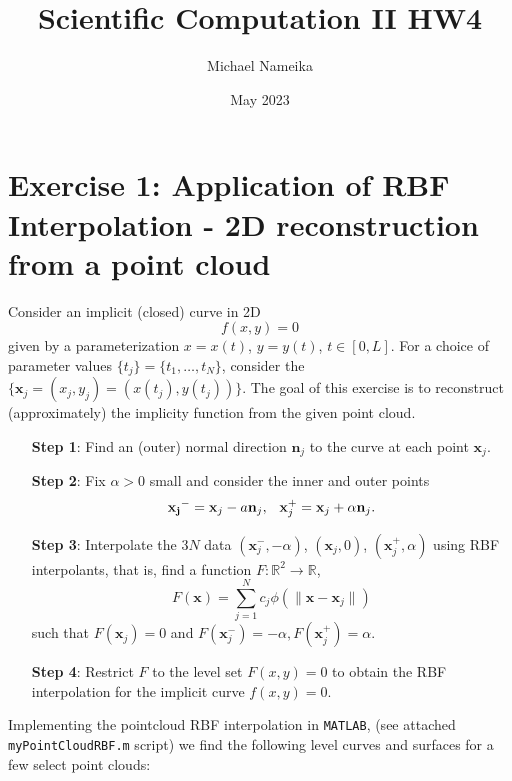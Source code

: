 \documentclass{article}
\title{Scientific Computation II HW4}
\author{Michael Nameika}
\date{May 2023}
\begin{document}
\maketitle

\section*{Exercise 1: Application of RBF Interpolation - 2D reconstruction from a point cloud}
Consider an implicit (closed) curve in 2D
\[f(x,y) = 0\]
given by a parameterization $x = x(t)$, $y = y(t)$, $t \in [0,L]$. For a choice of parameter values $\{t_j\} = \{t_1,\dots, t_N\}$, consider the  $\{\mathbf{x}_j = (x_j, y_j) = (x(t_j), y(t_j))\}$. The goal of this exercise is to reconstruct (approximately) the implicity function from the given point cloud.
\begin{itemize}
    \item[\textbf{Step 1}:] Find an (outer) normal direction $\mathbf{n}_j$ to the curve at each point $\mathbf{x}_j$.
    \newline\newline

    
    \item[\textbf{Step 2}:] Fix $\alpha > 0$ small and consider the inner and outer points
    \[\mathbf{x_j}^- = \mathbf{x}_j - a\mathbf{n}_j, \hspace{0.75em} \mathbf{x}_j^+ = \mathbf{x}_j + \alpha \mathbf{n}_j.\]

    \item[\textbf{Step 3}:] Interpolate the $3N$ data $(\mathbf{x}_j^-, -\alpha)$, $(\mathbf{x}_j, 0)$, $(\mathbf{x}_j^+, \alpha)$ using RBF interpolants, that is, find a function $F: \mathbb{R}^2 \to \mathbb{R}$, 
    \[F(\mathbf{x}) = \sum_{j=1}^Nc_j\phi(\|\mathbf{x} - \mathbf{x}_j\|)\]
    such that $F(\mathbf{x}_j) = 0$ and $F(\mathbf{x}_j^-) = -\alpha, F(\mathbf{x}_j^+) = \alpha$.
    \newline\newline

    \item[\textbf{Step 4}:] Restrict $F$ to the level set $F(x,y) = 0$ to obtain the RBF interpolation for the implicit curve $f(x,y) = 0$.
    \newline\newline
\end{itemize}
Implementing the pointcloud RBF interpolation in \verb+MATLAB+, (see attached \verb+myPointCloudRBF.m+ script) we find the following level curves and surfaces for a few select point clouds:
\end{document}
